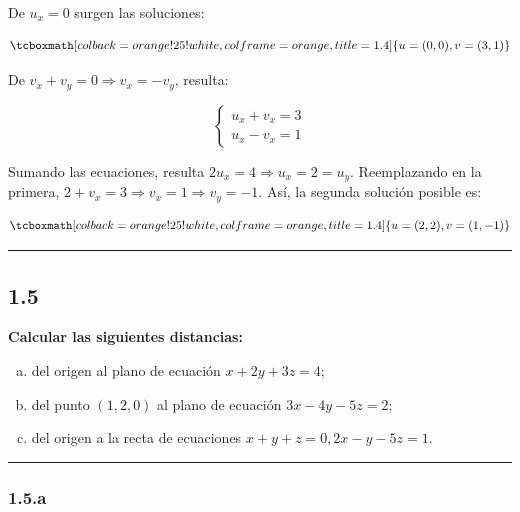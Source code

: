 \documentclass{article}
\begin{document}
De $u_x = 0$ surgen las soluciones:

\begin{equation}
\tcboxmath[colback=orange!25!white,colframe=orange,title=1.4]
{ u = (0,0), v = (3, 1) }
\end{equation}

De $v_x + v_y = 0 \Rightarrow v_x = -v_y$, resulta:

\begin{equation}
\left\{ \begin{array}{ll}
u_x + v_x = 3 \\
u_x - v_x = 1
\end{array} \right.
\end{equation}

Sumando las ecuaciones, resulta $2 u_x = 4 \Rightarrow u_x = 2 = u_y$. Reemplazando en la primera, $2 + v_x = 3 \Rightarrow v_x = 1 \Rightarrow v_y = -1$. Así, la segunda solución posible es:

\begin{equation}
\tcboxmath[colback=orange!25!white,colframe=orange,title=1.4]
{ u = (2,2), v = (1, -1) }
\end{equation}

\hrule
\vspace{10 pt}

\subsection*{1.5}
\label{subsec:1.5}

\textbf{Calcular las siguientes distancias:} 

\begin{enumerate}[(a)]
\bfseries
\item del origen al plano de ecuación $x + 2y +3z = 4$;

\item del punto $(1, 2, 0)$ al plano de ecuación $3x - 4y - 5z = 2$;

\item del origen a la recta de ecuaciones $x + y + z = 0, 2x - y -5z = 1$.
\end{enumerate}
\hrule

\subsubsection*{1.5.a}
\label{subsubsec:1.5.a}
\end{document}
